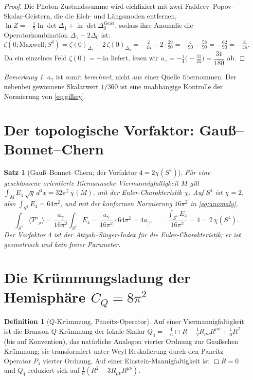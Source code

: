 \documentclass[11pt,a4paper]{article}
\newtheorem{theorem}{Satz}
\theoremstyle{definition}
\newtheorem{definition}{Definition}
\theoremstyle{remark}
\newtheorem{remark}{Bemerkung}
\newcommand{\ag}{a_\gamma}
\newcommand{\CQ}{C_Q}
\newcommand{\avg}[1]{\langle #1\rangle}
\begin{document}
\begin{proof}
\smallskip
Die Photon-Zustandssumme wird eichfixiert mit zwei Faddeev--Popov-Skalar-Geistern, die die Eich-
und Längsmoden entfernen, $\ln Z=-\tfrac12\ln\det\Delta_1+\ln\det\Delta_0^{\mathrm{Geist}}$, sodass
ihre Anomalie die Operatorkombination $\Delta_1-2\Delta_0$ ist:
\begin{equation}\label{eq:zetacombo}
\zeta(0;\mathrm{Maxwell};S^4)=\zeta(0)_{\Delta_1}-2\,\zeta(0)_{\Delta_0}
=-\tfrac{2}{45}-2\cdot\tfrac{29}{90}=-\tfrac{4}{90}-\tfrac{58}{90}=-\tfrac{62}{90}=-\tfrac{31}{45}.
\end{equation}
Da ein einzelnes Feld $\zeta(0)=-4a$ liefert, lesen wir
$\ag=-\tfrac14\bigl(-\tfrac{31}{45}\bigr)=\dfrac{31}{180}$ ab.
\end{proof}

\begin{remark}
$\ag$ ist somit \emph{berechnet}, nicht aus einer Quelle übernommen. Der nebenbei gewonnene
Skalarwert $1/360$ ist eine unabhängige Kontrolle der Normierung von \eqref{eq:gilkey}.
\end{remark}

\section{Der topologische Vorfaktor: Gauß--Bonnet--Chern}\label{sec:gbc}
\begin{theorem}[Gauß--Bonnet--Chern; der Vorfaktor $4=2\chi(S^4)$]\label{thm:gbc}
Für eine geschlossene orientierte Riemannsche Viermannigfaltigkeit $M$ gilt
$\displaystyle\int_M E_4\,\sqrt g\,d^4x=32\pi^2\,\chi(M)$, mit der Euler-Charakteristik $\chi$. Auf
$S^4$ ist $\chi=2$, also $\int_{S^4}E_4=64\pi^2$, und mit der konformen Normierung $16\pi^2$ in
\eqref{eq:anomaly},
\[
\int_{S^4}\avg{T^\mu{}_\mu}=\frac{\ag}{16\pi^2}\int_{S^4}E_4=\frac{\ag}{16\pi^2}\cdot 64\pi^2=4\ag,
\qquad
\frac{\int_{S^4}E_4}{16\pi^2}=4=2\,\chi(S^4).
\]
Der Vorfaktor $4$ ist der Atiyah--Singer-Index für die Euler-Charakteristik; er ist geometrisch und
kein freier Parameter. \cite{Chern,AtiyahSinger}
\end{theorem}

\section{Die Krümmungsladung der Hemisphäre $\CQ=8\pi^2$}\label{sec:Q}
\begin{definition}[$Q$-Krümmung, Paneitz-Operator]
Auf einer Viermannigfaltigkeit ist die Branson-$Q$-Krümmung der lokale Skalar
$Q_4=-\tfrac16\Box R-\tfrac12 R_{\mu\nu}R^{\mu\nu}+\tfrac16 R^2$ (bis auf Konvention), das
natürliche Analogon vierter Ordnung zur Gaußschen Krümmung; sie transformiert unter Weyl-Reskalierung
durch den Paneitz-Operator $P_4$ vierter Ordnung. Auf einer Einstein-Mannigfaltigkeit ist $\Box R=0$
und $Q_4$ reduziert sich auf $\tfrac16(R^2-3R_{\mu\nu}R^{\mu\nu})$.
\end{definition}
\end{document}
